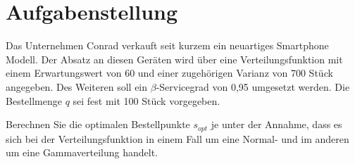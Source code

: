\section{Aufgabenstellung}
Das Unternehmen Conrad verkauft seit kurzem ein neuartiges Smartphone Modell. Der Absatz an diesen Geräten wird über eine Verteilungsfunktion mit einem Erwartungswert von 60 und einer zugehörigen Varianz von 700 Stück angegeben. Des Weiteren soll ein $\beta$-Servicegrad von 0,95 umgesetzt werden. Die Bestellmenge \(q\) sei fest mit 100 Stück vorgegeben.

Berechnen Sie die optimalen Bestellpunkte $s_{opt}$ je unter der Annahme, dass es sich bei der Verteilungsfunktion in einem Fall um eine Normal- und im anderen um eine Gammaverteilung handelt.